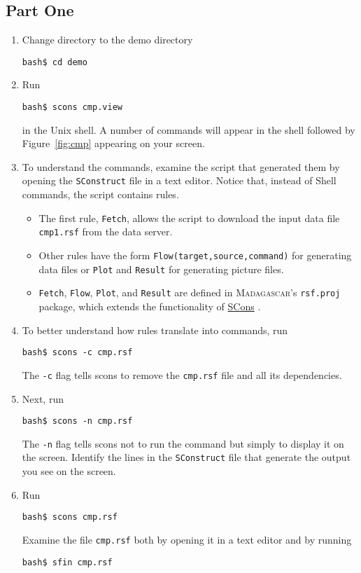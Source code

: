 \subsection{Part One}
\begin{enumerate}
\item Change directory to the demo directory
\begin{verbatim}
bash$ cd demo
\end{verbatim}
\item Run
\begin{verbatim}
bash$ scons cmp.view
\end{verbatim}
in the Unix shell. A number of commands will appear in the shell followed by Figure~\ref{fig:cmp} appearing on your screen. 
\item To understand the commands, examine the script that generated them by opening the \texttt{SConstruct} file in a text editor. Notice that, instead of Shell commands, the script contains rules. 
\begin{itemize}
\item The first rule, \texttt{Fetch}, allows the script to download the input data file \texttt{cmp1.rsf} from the data server. 
\item Other rules have the form \texttt{Flow(target,source,command)} for generating data files or \texttt{Plot} and  \texttt{Result} for 
generating picture files. 
\item \texttt{Fetch}, \texttt{Flow}, \texttt{Plot}, and \texttt{Result} are defined in \textsc{Madagascar}'s \texttt{rsf.proj} package, which extends the functionality of \href{http://www.scons.org}{SCons}
.
\end{itemize}
\item To better understand how rules translate into commands, run 
\begin{verbatim}
bash$ scons -c cmp.rsf
\end{verbatim}
The \texttt{-c} flag tells scons to remove the \texttt{cmp.rsf} file and all its dependencies.
\item Next, run
\begin{verbatim}
bash$ scons -n cmp.rsf
\end{verbatim}
The \texttt{-n} flag tells scons not to run the command but simply to display it on the screen. Identify the lines in the \texttt{SConstruct} file that generate the output you see on the screen.
\item Run
\begin{verbatim}
bash$ scons cmp.rsf
\end{verbatim}
Examine the file \texttt{cmp.rsf} both by opening it in a text editor and by running
\begin{verbatim}
bash$ sfin cmp.rsf
\end{verbatim}
\end{enumerate}

